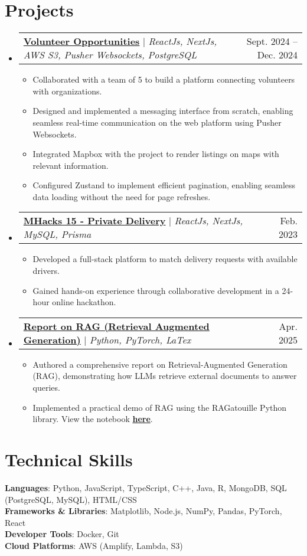 \documentclass[letterpaper,11pt]{article}
\makeatletter
\newcommand{\resumeItem}[1]{
  \item\small{
    {#1 \vspace{-2pt}}
  }
}
\newcommand{\resumeProjectHeading}[2]{
    \item
    \begin{tabular*}{0.97\textwidth}{l@{\extracolsep{\fill}}r}
      \small#1 & #2 \\
    \end{tabular*}\vspace{-7pt}
}
\newcommand{\resumeSubHeadingListStart}{\begin{itemize}[leftmargin=0.15in, label={}]}
\newcommand{\resumeSubHeadingListEnd}{\end{itemize}}
\newcommand{\resumeItemListStart}{\begin{itemize}}
\newcommand{\resumeItemListEnd}{\end{itemize}\vspace{-5pt}}
\makeatother
\begin{document}
\section{Projects}
    \resumeSubHeadingListStart
      \resumeProjectHeading
          {\href{https://volunteer-opportunities.vercel.app/}{\color{Blue}\textbf{Volunteer Opportunities}} $|$ \emph{ReactJs, NextJs, AWS S3, Pusher Websockets, PostgreSQL}}{Sept. 2024 -- Dec. 2024}
          \resumeItemListStart
            \resumeItem{Collaborated with a team of 5 to build a platform connecting volunteers with organizations.}
            \resumeItem{Designed and implemented a messaging interface from scratch, enabling seamless real-time communication on the
 web platform using Pusher Websockets.}
            \resumeItem{Integrated Mapbox with the project to render listings on maps with relevant information.}
            \resumeItem{Configured Zustand to implement efficient pagination, enabling seamless data loading without the need for page
 refreshes.}
          \resumeItemListEnd
      \resumeProjectHeading
          {\href{https://devpost.com/software/privatedelivery/}{\color{Blue}\textbf{MHacks 15 - Private Delivery}} $|$ \emph{ReactJs, NextJs, MySQL, Prisma}}{Feb. 2023}
          \resumeItemListStart
            \resumeItem{Developed a full-stack platform to match delivery requests with available drivers.}
            \resumeItem{Gained hands-on experience through collaborative development in a 24-hour online hackathon.}
          \resumeItemListEnd
      \resumeProjectHeading
          {\href{https://github.com/SebastianNewberry/Final_Project_Intro_LLM/blob/main/Report.pdf}{\color{Blue}\textbf{Report on RAG (Retrieval Augmented Generation)}} $|$ \emph{Python, PyTorch, LaTex}}{Apr. 2025}
          \resumeItemListStart
            \resumeItem{Authored a comprehensive report on Retrieval-Augmented Generation (RAG), demonstrating how LLMs retrieve external documents to answer queries.}
            \resumeItem{Implemented a practical demo of RAG using the RAGatouille Python library. View the notebook \href{https://colab.research.google.com/github/SebastianNewberry/Final_Project_Intro_LLM/blob/main/langchain_ollama_rag.ipynb}{\color{Blue}\textbf{here}}.}
          \resumeItemListEnd
    \resumeSubHeadingListEnd



%
\section{Technical Skills}
 \begin{itemize}[leftmargin=0.15in, label={}]
    \small{\item{
     \textbf{Languages}{: Python, JavaScript, TypeScript, C++, Java, R, MongoDB, SQL (PostgreSQL, MySQL), HTML/CSS} \\
     \textbf{Frameworks \& Libraries}{: Matplotlib, Node.js, NumPy, Pandas, PyTorch, React} \\
     \textbf{Developer Tools}{: Docker, Git} \\
     \textbf{Cloud Platforms}{: AWS (Amplify, Lambda, S3)}
    }}
 \end{itemize}


\end{document}
